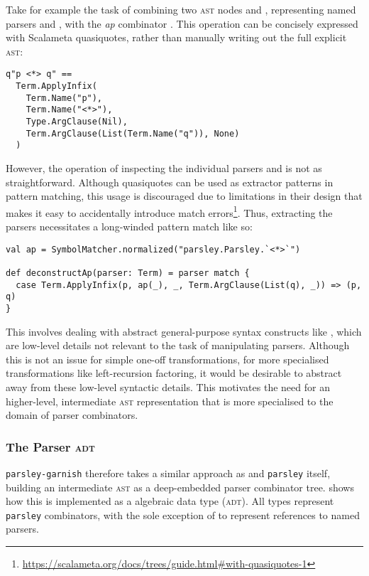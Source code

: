\documentclass[../../main.tex]{subfiles}
\begin{document}
Take for example the task of combining two \textsc{ast} nodes  and , representing named parsers  and , with the \emph{ap} combinator \scala{<*>}.
This operation can be concisely expressed with Scalameta quasiquotes, rather than manually writing out the full explicit \textsc{ast}:
\begin{verbatim}
q"p <*> q" ==
  Term.ApplyInfix(
    Term.Name("p"),
    Term.Name("<*>"),
    Type.ArgClause(Nil),
    Term.ArgClause(List(Term.Name("q")), None)
  )
\end{verbatim}
However, the  operation of inspecting the individual parsers  and  is not as straightforward.
Although quasiquotes can be used as extractor patterns in pattern matching, this usage is discouraged due to limitations in their design that makes it easy to accidentally introduce match errors\footnote{\url{https://scalameta.org/docs/trees/guide.html#with-quasiquotes-1}}.
Thus, extracting the parsers necessitates a long-winded pattern match like so:
\begin{verbatim}
val ap = SymbolMatcher.normalized("parsley.Parsley.`<*>`")

def deconstructAp(parser: Term) = parser match {
  case Term.ApplyInfix(p, ap(_), _, Term.ArgClause(List(q), _)) => (p, q)
}
\end{verbatim}
This involves dealing with abstract general-purpose syntax constructs like , which are low-level details not relevant to the task of manipulating parsers.
Although this is not an issue for simple one-off transformations, for more specialised transformations like left-recursion factoring, it would be desirable to abstract away from these low-level syntactic details.
This motivates the need for an higher-level, intermediate \textsc{ast} representation that is more specialised to the domain of parser combinators.

\subsubsection{The Parser \textsc{adt}}
\texttt{parsley-garnish} therefore takes a similar approach as \textcite{baars_leftrec_2004} and \texttt{parsley} itself, building an intermediate \textsc{ast} as a deep-embedded parser combinator tree.
 shows how this is implemented as a  algebraic data type (\textsc{adt}).
All  types represent \texttt{parsley} combinators, with the sole exception of  to represent references to named parsers.
\end{document}
